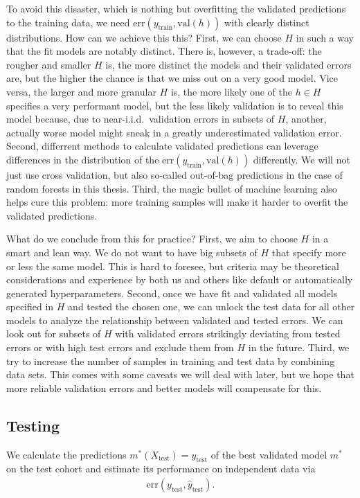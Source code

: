 To avoid this disaster, which is nothing but overfitting the validated predictions to the training 
data, we need $\text{err}(y_\text{train}, \text{val}(h))$ with clearly distinct distributions. 
How can we achieve this this? First, we can choose $H$ in such a way that the fit models are 
notably distinct. There is, however, a trade-off: the rougher and smaller $H$ is, the more distinct 
the models and their validated errors are, but the higher the chance is that we miss out on a very good 
model. Vice versa, the larger and more granular $H$ is, the more likely one of the $h \in H$ 
specifies a very performant model, but the less likely validation is to reveal this model because,
due to near-i.i.d.\ validation errors in subsets of $H$, another, actually worse model might sneak 
in a greatly underestimated validation error. Second, differrent methods to calculate validated
predictions can leverage differences in the distribution of the 
$\text{err}(y_\text{train}, \text{val}(h))$ differently. We will not just use cross validation, but 
also so-called out-of-bag predictions in the case of random forests in this thesis. Third, the 
magic bullet of machine learning also helps cure this problem: more training samples will make it 
harder to overfit the validated predictions.

What do we conclude from this for practice? First, we aim to choose $H$ in a smart and lean way. 
We do not want to have big subsets of $H$ that specify more or less the same model. This is hard 
to foresee, but criteria may be theoretical considerations and experience by both us and others 
like default or automatically generated hyperparameters. Second, once we have fit and validated 
all models specified in $H$ and tested the chosen one, we can unlock the test data for all other 
models to analyze the relationship between validated and tested errors. We can look out for subsets 
of $H$ with validated errors strikingly deviating from tested errors or with high test errors and 
exclude them from $H$ in the future. Third, we try to increase the number of samples in training 
and test data by combining data sets. This comes with some caveats we will deal with later, but 
we hope that more reliable validation errors and better models will compensate for this.

\subsection{Testing}

We calculate the predictions $m^*(X_\text{test}) = \hat{y}_\text{test}$ of the best validated model 
$m^*$ on the test cohort and estimate its performance on independent data via 
\begin{align}
    \text{err}(y_\text{test}, \hat{y}_\text{test}).
\end{align}

